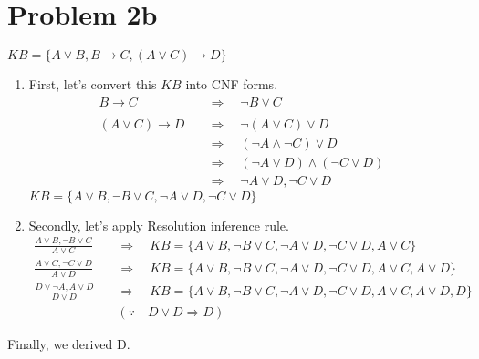 \documentclass[12pt]{article}
\begin{document}
\newpage

\section*{Problem 2b}
$KB = \{A \lor B, B \xrightarrow{} C, ( A \lor C) \xrightarrow{} D\}$ \\
\begin{enumerate}[label=(\roman*)]
    \item\text First, let's convert this $KB$ into CNF forms.
        \begin{align*}
            {B \xrightarrow{} C} \quad &\Rightarrow \quad {\neg B \lor C} \\ \\
            {(A \lor C) \xrightarrow{} D} \quad &\Rightarrow \quad { \neg (A \lor C) \lor D} \quad \\&\Rightarrow \quad {(\neg A \land \neg C) \lor D} \quad \\&\Rightarrow \quad {(\neg A \lor D) \land (\neg C \lor D)} \quad \\&\Rightarrow \quad {\neg A \lor D, \neg C \lor D}
        \end{align*}
    $KB = \{{A \lor B}, {\neg B \lor C}, {\neg A \lor D}, {\neg C \lor D}\}$ \\

    \item\text Secondly, let's apply Resolution inference rule. \\
        \begin{align*}
            \frac{A \lor B, \neg B \lor C}{A \lor C} \quad &\Rightarrow \quad KB = \{{A \lor B}, {\neg B \lor C}, {\neg A \lor D}, {\neg C \lor D}, {A \lor C} \} \\
            \frac{A \lor C, \neg C \lor D}{A \lor D} \quad &\Rightarrow \quad KB = \{{A \lor B}, {\neg B \lor C}, {\neg A \lor D}, {\neg C \lor D}, {A \lor C}, {A \lor D} \} \\
            \frac{D \lor \neg A, A \lor D}{D \lor D} \quad &\Rightarrow \quad KB = \{{A \lor B}, {\neg B \lor C}, {\neg A \lor D},{\neg C \lor D}, {A \lor C}, {A \lor D}, {D} \} \\ &(\because \quad D \lor D \Rightarrow D)
        \end{align*}
\end{enumerate}
\text Finally, we derived D. \\
\end{document}
